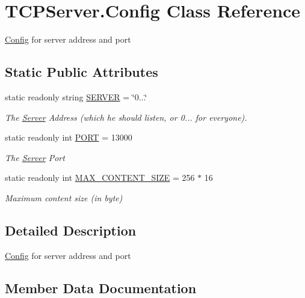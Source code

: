 \hypertarget{classTCPServer_1_1Config}{}\section{T\+C\+P\+Server.\+Config Class Reference}
\label{classTCPServer_1_1Config}


\hyperlink{classTCPServer_1_1Config}{Config} for server address and port  


\subsection*{Static Public Attributes}
\begin{DoxyCompactItemize}
\item 
static readonly string \hyperlink{classTCPServer_1_1Config_a22ee5c50b7d042facea60ec7ee40d836}{S\+E\+R\+V\+E\+R} = \char`\"{}0...\char`\"{}
\begin{DoxyCompactList}\small\item\em The \hyperlink{namespaceServer}{Server} Address (which he should listen, or 0... for everyone). \end{DoxyCompactList}\item 
static readonly int \hyperlink{classTCPServer_1_1Config_ac5d512f1a28d2c8c42bd175095eaacf7}{P\+O\+R\+T} = 13000
\begin{DoxyCompactList}\small\item\em The \hyperlink{namespaceServer}{Server} Port \end{DoxyCompactList}\item 
static readonly int \hyperlink{classTCPServer_1_1Config_a47b1681acf21be479018e3c93cbeaa5e}{M\+A\+X\+\_\+\+C\+O\+N\+T\+E\+N\+T\+\_\+\+S\+I\+Z\+E} = 256 $\ast$ 16
\begin{DoxyCompactList}\small\item\em Maximum content size (in byte) \end{DoxyCompactList}\end{DoxyCompactItemize}


\subsection{Detailed Description}
\hyperlink{classTCPServer_1_1Config}{Config} for server address and port 



\subsection{Member Data Documentation}
\hypertarget{classTCPServer_1_1Config_a47b1681acf21be479018e3c93cbeaa5e}{}
